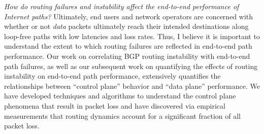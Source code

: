 {\em How do routing failures and instability affect the end-to-end
  performance of Internet paths?}  Ultimately, end users and network
  operators are concerned with whether or not {\em data} packets
  ultimately reach their intended destinations along loop-free paths
  with low latencies and loss rates.  Thus, I believe it is important to
  understand the extent to which routing failures are reflected in
  end-to-end path performance.  Our work on correlating BGP routing
  instability with end-to-end path failures, as well as our subsequent
  work on quantifying the effects of routing instability on end-to-end
  path performance, extensively quantifies the relationships between
  ``control plane'' behavior and ``data plane'' performance.  We have
  developed techniques and algorithms to understand the control plane
  phenomena that result in packet loss and have discovered via empirical
  measurements that routing dynamics account for a significant fraction
  of all packet loss.
